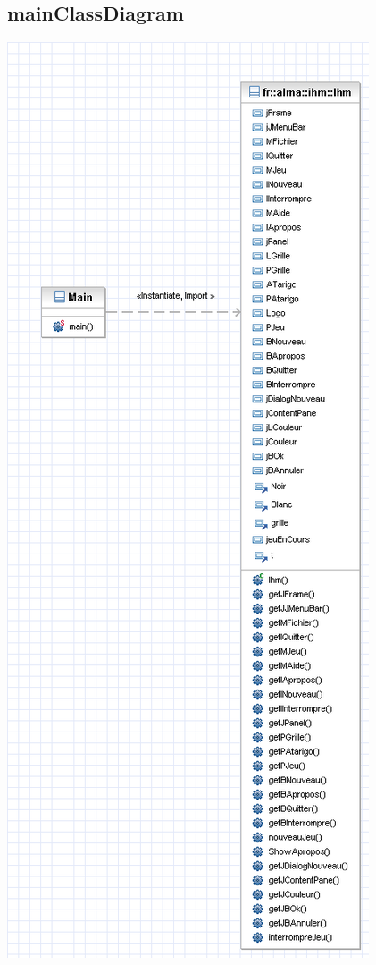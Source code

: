 \documentclass{report}
\begin{document}
\subsection{mainClassDiagram}
\begin{center}
\includegraphics[scale=0.50]{images/fralmamainClassDiagram}
\end{center}
\end{document}
